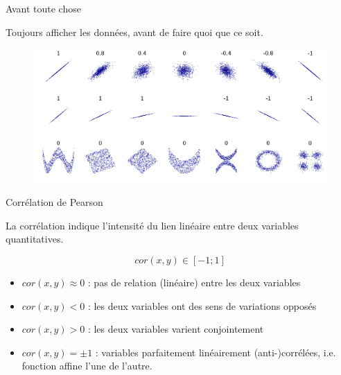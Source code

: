 \documentclass{beamer}
\begin{document}
\begin{frame}{Avant toute chose}

\alert{Toujours} afficher les données, avant de faire quoi que ce soit.



\begin{figure}
  \centering
     \includegraphics[width=\linewidth]{img/correlation_examples2.png}
\end{figure}



\end{frame}




\begin{frame}{Corrélation de Pearson}


La \alert{corrélation} indique l’\alert{intensité} du lien \alert {linéaire} entre deux variables quantitatives.





$$cor(x,y)\in[-1;1]$$



\begin{itemize}
  \item $cor(x,y)\approx0$ : pas de relation (\alert{linéaire}) entre les deux variables

  \item $cor(x,y)<0$  : les deux variables ont des sens de variations opposés
  \item $cor(x,y)>0$  : les deux variables varient conjointement 

  \item $cor(x,y)= \pm 1$ : variables parfaitement linéairement (anti-)corrélées, i.e. fonction affine l'une de l'autre. 
\end{itemize}

\end{frame}
\end{document}
